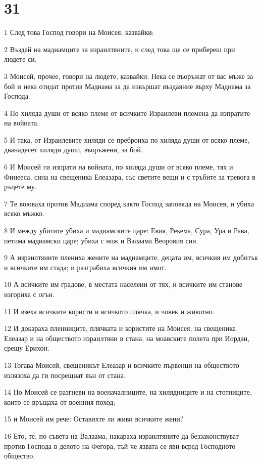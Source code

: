 \chapter{31}

\par 1 След това Господ говори на Моисея, казвайки:
\par 2 Въздай на мадиамците за израилтяните, и след това ще се прибереш при людете си.
\par 3 Моисей, прочее, говори на людете, казвайки: Нека се въоръжат от вас мъже за бой и нека отидат против Мадиама за да извършат въздаяние върху Мадиама за Господа.
\par 4 По хиляда души от всяко племе от всичките Израилеви племена да изпратите на войната.
\par 5 И така, от Израилевите хиляди се преброиха по хиляда души от всяко племе, дванадесет хиляди души, въоръжени, за бой.
\par 6 И Моисей ги изпрати на войната, по хиляда души от всяко племе, тях и Финееса, сина на свещеника Елеазара, със светите вещи и с тръбите за тревога в ръцете му.
\par 7 Те воюваха против Мадиама според както Господ заповяда на Моисея, и убиха всяко мъжко.
\par 8 И между убитите убиха и мадиамските царе: Евия, Рекема, Сура, Ура и Рава, петима мадиамски царе; убиха с нож и Валаама Веоровия син.
\par 9 А израилтяните плениха жените на мадиамците, децата им, всичкия им добитък и всичките им стада; и разграбиха всичкия им имот.
\par 10 А всичките им градове, в местата населени от тях, и всичките им станове изгориха с огън.
\par 11 И взеха всичките користи и всичкото плячка, и човек и животно.
\par 12 И докараха пленниците, плячката и користите на Моисея, на свещеника Елеазар и на обществото израилтяни в стана, на моавските полета при Иордан, срещу Ерихон.
\par 13 Тогава Моисей, свещеникът Елеазар и всичките първенци на обществото излязоха да ги посрещнат вън от стана.
\par 14 Но Моисей се разгневи на военачалниците, на хилядниците и на стотниците, които се връщаха от военния поход;
\par 15 и Моисей им рече: Оставихте ли живи всичките жени?
\par 16 Ето, те, по съвета на Валаама, накараха израилтяните да беззаконствуват против Господа в делото на Фегора, тъй че язвата се яви всред Господното общество.
